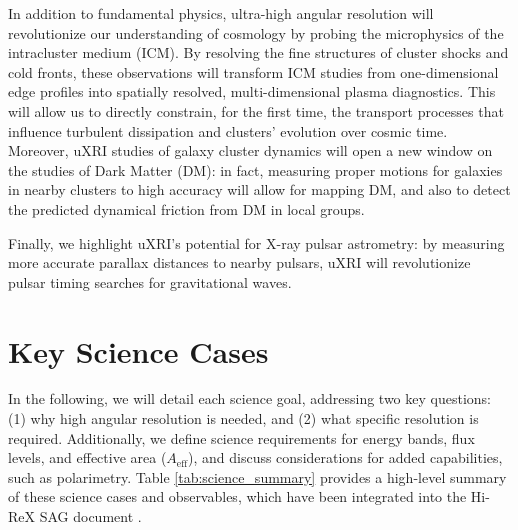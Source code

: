 \documentclass[fleqn,10pt]{SelfArx}
\begin{document}
In addition to fundamental physics, ultra-high angular resolution will revolutionize our understanding of cosmology by probing the microphysics of the intracluster medium (ICM). By resolving the fine structures of cluster shocks and cold fronts, these observations will transform ICM studies from one-dimensional edge profiles into spatially resolved, multi-dimensional plasma diagnostics. This will allow us to directly constrain, for the first time, the transport processes that influence turbulent dissipation and clusters' evolution over cosmic time. Moreover, uXRI studies of galaxy cluster dynamics will open a new window on the studies of Dark Matter (DM): in fact, measuring proper motions for galaxies in nearby clusters to high accuracy will allow for mapping DM, and also to detect the predicted dynamical friction from DM in local groups.

Finally, we highlight uXRI's potential for X-ray pulsar astrometry: by measuring more accurate parallax distances to nearby pulsars, uXRI will revolutionize pulsar timing searches for gravitational waves.




\section{Key Science Cases}

 In the following, we will detail each science goal, addressing two key questions: (1) why high angular resolution is needed, and (2) what specific resolution is required. Additionally, we define science requirements for energy bands, flux levels, and effective area ($A_{\text{eff}}$), and discuss considerations for added capabilities, such as polarimetry. Table \ref{tab:science_summary} provides a high-level summary of these science cases and observables, which have been integrated into the Hi-ReX SAG document \citep{HiReX-SAG_report}.
\end{document}
